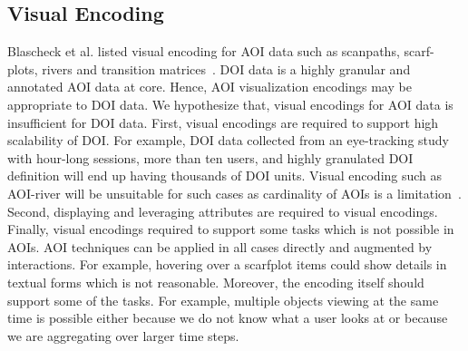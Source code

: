 \subsection{Visual Encoding}
Blascheck et al. listed visual encoding for AOI data such as scanpaths, scarf-plots, rivers and transition matrices~\cite{blascheck2014state}. DOI data is a highly granular and annotated AOI data at core. Hence, AOI visualization encodings may be appropriate to DOI data. We hypothesize that, visual encodings for AOI data is insufficient for DOI data. First, visual encodings are required to support high scalability of DOI. For example, DOI data collected from an eye-tracking study with hour-long sessions, more than ten users, and highly granulated DOI definition will end up having thousands of DOI units. Visual encoding such as AOI-river will be unsuitable for such cases as cardinality of AOIs is a limitation~\cite{burch2013aoi}. Second, displaying and leveraging attributes are required to visual encodings. Finally, visual encodings required to support some tasks which is not possible in AOIs. AOI techniques can be applied in all cases directly and augmented by interactions. For example, hovering over a scarfplot items could show details in textual forms which is not reasonable. Moreover, the encoding itself should support some of the tasks. For example, multiple objects viewing at the same time is possible either because we do not know what a user looks at or because we are aggregating over larger time steps.

